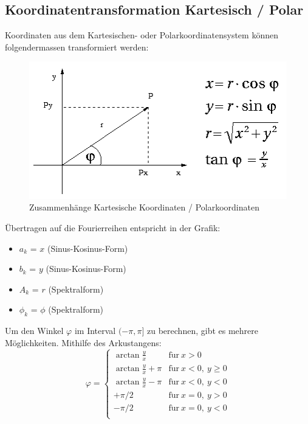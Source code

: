 \documentclass[10pt,a4paper]{scrartcl}
\begin{document}
\subsection{Koordinatentransformation Kartesisch / Polar}

Koordinaten aus dem Kartesischen- oder Polarkoordinatensystem können
folgendermassen transformiert werden:

\begin{figure}[H]
    \centering
    \includegraphics[scale=0.5]{img/Koordinatentransformation.png}
    \caption{Zusammenhänge Kartesische Koordinaten / Polarkoordinaten}
\end{figure}

Übertragen auf die Fourierreihen entspricht in der Grafik:
\begin{itemize}
    \item $a_k$ = $x$ (Sinus-Kosinus-Form)
    \item $b_k$ = $y$ (Sinus-Kosinus-Form)
    \item $A_k$ = $r$ (Spektralform)
    \item $\phi_k$ = $\phi$ (Spektralform)
\end{itemize}

Um den Winkel $\varphi$ im Interval $(-\pi, \pi]$ zu berechnen, gibt es mehrere
Möglichkeiten. Mithilfe des Arkustangens:
$$\varphi = \begin{cases}
    \arctan\frac{y}{x} & \mathrm{f\ddot ur}\ x > 0\\
    \arctan\frac{y}{x} + \pi & \mathrm{f\ddot ur}\ x < 0,\ y \geq 0\\
    \arctan\frac{y}{x} - \pi & \mathrm{f\ddot ur}\ x < 0,\ y < 0\\
    +\pi/2 & \mathrm{f\ddot ur}\ x = 0,\ y > 0\\
    -\pi/2 & \mathrm{f\ddot ur}\ x = 0,\ y < 0\\
\end{cases}$$
\end{document}
